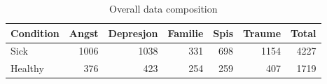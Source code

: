 \begin{table}[H]
\centering
\caption{Overall data composition}
\begin{tabular}{lrrrrrr}
\toprule
Condition &  Angst &  Depresjon &  Familie &  Spis &  Traume &  Total \\
\midrule
     Sick &   1006 &       1038 &      331 &   698 &    1154 &   4227 \\
  Healthy &    376 &        423 &      254 &   259 &     407 &   1719 \\
\bottomrule
\end{tabular}
\end{table}
